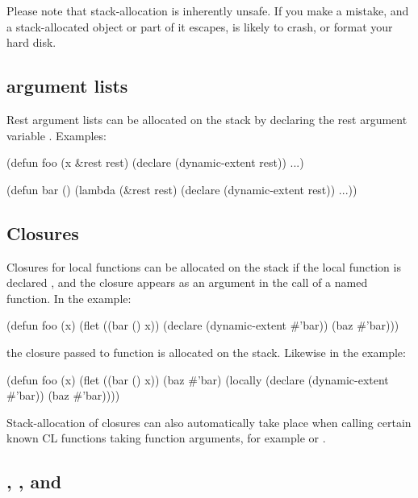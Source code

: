 Please note that stack-allocation is inherently unsafe.  If you make a
mistake, and a stack-allocated object or part of it escapes, \cmucl{}
is likely to crash, or format your hard disk.

\subsection{ argument lists}

Rest argument lists can be allocated on the stack by declaring the
rest argument variable .  Examples:

\begin{lisp}
(defun foo (x &rest rest)
  (declare (dynamic-extent rest))
  ...)

(defun bar ()
  (lambda (&rest rest)
    (declare (dynamic-extent rest))
    ...))
\end{lisp}

\subsection{Closures}

Closures for local functions can be allocated on the stack if the
local function is declared , and the closure
appears as an argument in the call of a named function.  In the
example:

\begin{lisp}
(defun foo (x)
  (flet ((bar () x))
    (declare (dynamic-extent #'bar))
    (baz #'bar)))
\end{lisp}

the closure passed to function  is allocated on the stack.
Likewise in the example:

\begin{lisp}
(defun foo (x)
  (flet ((bar () x))
    (baz #'bar)
    (locally (declare (dynamic-extent #'bar))
      (baz #'bar))))
\end{lisp}


Stack-allocation of closures can also automatically take place when
calling certain known CL functions taking function arguments, for
example  or .

\subsection{, , and }

